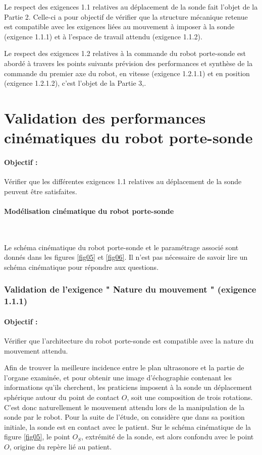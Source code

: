 Le respect des exigences 1.1 relatives au déplacement de la sonde fait l'objet de la Partie 2. Celle-ci a pour objectif de vérifier que la structure mécanique retenue est compatible avec les exigences liées au mouvement à imposer à la sonde (exigence 1.1.1) et à l'espace de travail attendu (exigence 1.1.2).

Le respect des exigences 1.2 relatives à la commande du robot porte-sonde est abordé à travers les points suivants prévision des performances et synthèse de la commande du premier axe du robot, en vitesse (exigence 1.2.1.1) et en position (exigence 1.2.1.2), c'est l'objet de la Partie 3,. 

\section{Validation des performances cinématiques du robot porte-sonde}

\paragraph{Objectif :} Vérifier que les différentes exigences 1.1 relatives au déplacement de la sonde peuvent être satisfaites. 

\paragraph{Modélisation cinématique du robot porte-sonde} ~\

Le schéma cinématique du robot porte-sonde et le paramétrage associé sont donnés dans les figures \ref{fig05} et \ref{fig06}. Il n'est pas nécessaire de savoir lire un schéma cinématique pour répondre aux questions.

\subsubsection{Validation de l'exigence " Nature du mouvement " (exigence 1.1.1)}

\paragraph{Objectif :} Vérifier que l'architecture du robot porte-sonde est compatible avec la nature du mouvement attendu.

Afin de trouver la meilleure incidence entre le plan ultrasonore et la partie de l'organe examinée, et pour obtenir une image d'échographie contenant les informations qu'ils cherchent, les praticiens imposent à la sonde un déplacement sphérique autour du point de contact $O$, soit une composition de trois rotations. C'est donc naturellement le mouvement attendu lors de la manipulation de la sonde par le robot. Pour la suite de l'étude, on considère que dans sa position initiale, la sonde est en contact avec le patient. Sur le schéma cinématique de la figure \ref{fig05}, le point $O_S$, extrémité de la sonde, est alors confondu avec le point $O$, origine du repère lié au patient. 

